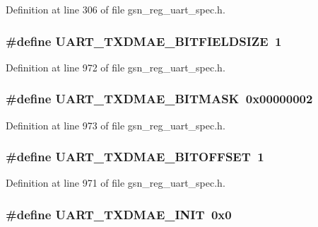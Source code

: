 Definition at line 306 of file gsn\_\-reg\_\-uart\_\-spec.h.

\hypertarget{a00575_ae8542070a7445d98df32fee7f1a02cac}{
\subsubsection[{UART\_\-TXDMAE\_\-BITFIELDSIZE}]{\setlength{\rightskip}{0pt plus 5cm}\#define UART\_\-TXDMAE\_\-BITFIELDSIZE~1}}
\label{a00575_ae8542070a7445d98df32fee7f1a02cac}


Definition at line 972 of file gsn\_\-reg\_\-uart\_\-spec.h.

\hypertarget{a00575_a6b38e08c9c573ef902dde64caec83b50}{
\subsubsection[{UART\_\-TXDMAE\_\-BITMASK}]{\setlength{\rightskip}{0pt plus 5cm}\#define UART\_\-TXDMAE\_\-BITMASK~0x00000002}}
\label{a00575_a6b38e08c9c573ef902dde64caec83b50}


Definition at line 973 of file gsn\_\-reg\_\-uart\_\-spec.h.

\hypertarget{a00575_a043a775d60773a4775a21e24e9d31839}{
\subsubsection[{UART\_\-TXDMAE\_\-BITOFFSET}]{\setlength{\rightskip}{0pt plus 5cm}\#define UART\_\-TXDMAE\_\-BITOFFSET~1}}
\label{a00575_a043a775d60773a4775a21e24e9d31839}


Definition at line 971 of file gsn\_\-reg\_\-uart\_\-spec.h.

\hypertarget{a00575_afbd857375e0203b5563db98cccad80d3}{
\subsubsection[{UART\_\-TXDMAE\_\-INIT}]{\setlength{\rightskip}{0pt plus 5cm}\#define UART\_\-TXDMAE\_\-INIT~0x0}}
\label{a00575_afbd857375e0203b5563db98cccad80d3}


